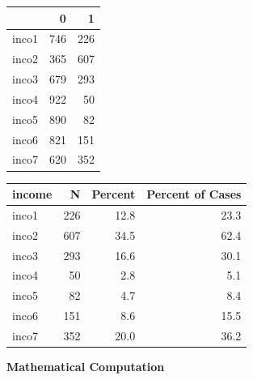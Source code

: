 \documentclass[
]{article}
\newenvironment{Shaded}{}{}
\newcommand{\AttributeTok}[1]{#1}
\newcommand{\DecValTok}[1]{\textcolor[rgb]{0.00,0.00,0.80}{#1}}
\newcommand{\FunctionTok}[1]{#1}
\newcommand{\NormalTok}[1]{#1}
\newcommand{\OtherTok}[1]{\textcolor[rgb]{1.00,0.25,0.00}{#1}}
\newcommand{\SpecialCharTok}[1]{\textcolor[rgb]{0.00,0.50,0.50}{#1}}
\newcommand{\StringTok}[1]{\textcolor[rgb]{0.01,0.42,0.03}{#1}}
\begin{document}
\begin{longtable}[]{@{}lrr@{}}
\toprule\noalign{}
& 0 & 1 \\
\midrule\noalign{}
\endhead
\bottomrule\noalign{}
\endlastfoot
inco1 & 746 & 226 \\
inco2 & 365 & 607 \\
inco3 & 679 & 293 \\
inco4 & 922 & 50 \\
inco5 & 890 & 82 \\
inco6 & 821 & 151 \\
inco7 & 620 & 352 \\
\end{longtable}

\begin{Shaded}
\end{Shaded}

\begin{longtable}[]{@{}lrrr@{}}
\toprule\noalign{}
income & N & Percent & Percent of Cases \\
\midrule\noalign{}
\endhead
\bottomrule\noalign{}
\endlastfoot
inco1 & 226 & 12.8 & 23.3 \\
inco2 & 607 & 34.5 & 62.4 \\
inco3 & 293 & 16.6 & 30.1 \\
inco4 & 50 & 2.8 & 5.1 \\
inco5 & 82 & 4.7 & 8.4 \\
inco6 & 151 & 8.6 & 15.5 \\
inco7 & 352 & 20.0 & 36.2 \\
\end{longtable}

\textbf{Mathematical Computation}
\end{document}
